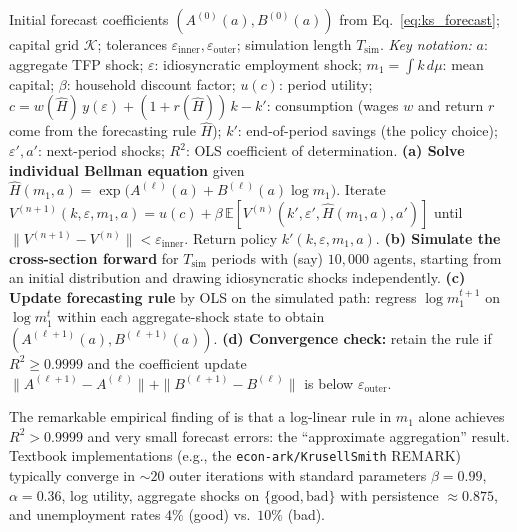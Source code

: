 \documentclass[11pt,a4paper]{report}
\newcommand{\E}[1]{\mathbb{E}\!\left[#1\right]}
\begin{document}
\begin{definitionbox}
\begin{algorithmic}
\small
\REQUIRE Initial forecast coefficients $(A^{(0)}(a), B^{(0)}(a))$ from Eq.~\eqref{eq:ks_forecast}; capital grid $\mathcal{K}$; tolerances $\varepsilon_{\mathrm{inner}},\varepsilon_{\mathrm{outer}}$; simulation length $T_{\mathrm{sim}}$.
\STATE \textit{Key notation:} $a$: aggregate TFP shock; $\varepsilon$: idiosyncratic employment shock; $m_1 = \int k\,d\mu$: mean capital; $\beta$: household discount factor; $u(c)$: period utility; $c = w(\hat H)\,y(\varepsilon) + (1+r(\hat H))\,k - k'$: consumption (wages $w$ and return $r$ come from the forecasting rule $\hat H$); $k'$: end-of-period savings (the policy choice); $\varepsilon', a'$: next-period shocks; $R^2$: OLS coefficient of determination.
    \STATE \textbf{(a) Solve individual Bellman equation} given $\hat H(m_1, a) = \exp\!\bigl(A^{(\ell)}(a) + B^{(\ell)}(a)\log m_1\bigr)$.
    \STATE \quad Iterate $V^{(n+1)}(k, \varepsilon, m_1, a) = u(c) + \beta\, \E{V^{(n)}(k', \varepsilon', \hat H(m_1,a), a')}$ until $\|V^{(n+1)}-V^{(n)}\| < \varepsilon_{\mathrm{inner}}$.
    \STATE \quad Return policy $k'(k, \varepsilon, m_1, a)$.
    \STATE \textbf{(b) Simulate the cross-section forward} for $T_{\mathrm{sim}}$ periods with (say) $10{,}000$ agents, starting from an initial distribution and drawing idiosyncratic shocks independently.
    \STATE \textbf{(c) Update forecasting rule} by OLS on the simulated path: regress $\log m_1^{t+1}$ on $\log m_1^t$ within each aggregate-shock state to obtain $(A^{(\ell+1)}(a), B^{(\ell+1)}(a))$.
    \STATE \textbf{(d) Convergence check:} retain the rule if $R^2 \geq 0.9999$ and the coefficient update $\|A^{(\ell+1)}-A^{(\ell)}\| + \|B^{(\ell+1)}-B^{(\ell)}\|$ is below $\varepsilon_{\mathrm{outer}}$.
\ENDFOR
\end{algorithmic}
\end{definitionbox}

The remarkable empirical finding of \citet{krusell1998income} is that a log-linear rule in $m_1$ alone achieves $R^2 > 0.9999$ and very small forecast errors: the ``approximate aggregation'' result.  Textbook implementations (e.g., the \texttt{econ-ark/KrusellSmith} REMARK) typically converge in $\sim 20$ outer iterations with standard parameters $\beta = 0.99$, $\alpha = 0.36$, log utility, aggregate shocks on $\{\text{good},\text{bad}\}$ with persistence $\approx 0.875$, and unemployment rates $4\%$ (good) vs.\ $10\%$ (bad).
\end{document}
